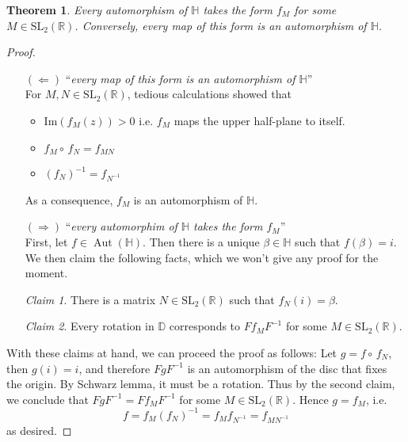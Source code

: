 \documentclass{article}
\theoremstyle{plain}
\newtheorem{theorem}{Theorem}
\theoremstyle{remark}
\newtheorem{claim}{Claim}
\DeclareMathOperator{\Aut}{Aut}
\def\IM{\text{Im}}
\def\inv{^{-1}}
\def\SL{\text{SL}_2(\mathbb R)}
\def\H{\mathbb{H}}
\def\D{\mathbb{D}}
\begin{document}
\noindent\hrulefill
\begin{theorem}
  Every automorphism of $\H$ takes the form $f_M$ for some $M\in\SL$.
  Conversely, every map of this form is an automorphism of $\H$.
\end{theorem}
\noindent\hrulefill
\begin{proof}
  \text{}
  \begin{itemize}
   \item[$(\Leftarrow)$] ``\textit{every map of this form is an automorphism of $\H$}''\\[0.2cm]
     For $M, N\in\SL$,  tedious calculations showed that
     \begin{itemize}[label={$\rhd$}]
     \item $\IM(f_M(z))>0$ i.e. $f_M$ maps the upper half-plane to itself.
     \item $f_M \circ\, f_N = f_{MN}$
     \item $(f_N)\inv = f_{N\inv}$
     \end{itemize}
     As a consequence, $f_M$ is an automorphism of $\H$.
     
   \item[$(\Rightarrow)$] ``\textit{every automorphim of $\H$ takes the form $f_M$}''\\[0.2cm]
     First, let $f\in\Aut(\H)$. Then there is a unique $\beta\in\H$  such that
     $f(\beta)=i$. We then claim the following facts, which we won't give any proof
     for the moment.
     \begin{claim}
       There is a matrix $N\in\SL$ such that $f_N(i)=\beta$.
     \end{claim}
     \begin{claim}
       Every rotation in $\D$ corresponds to $Ff_MF\inv$ for some $M\in\SL$.
     \end{claim}
   \end{itemize}

   With these claims at hand, we can proceed the proof as follows: Let $g=f\circ\,f_N$, then
   $g(i)=i$, and therefore $FgF\inv$ is an automorphism of the disc that fixes the origin.
   By Schwarz lemma, it must be a rotation. Thus by the second claim, we conclude that
   $FgF\inv = Ff_MF\inv$ for some $M\in\SL$. Hence $g=f_M$, i.e.
   \[f = f_M(f_N)\inv = f_Mf_{N\inv}= f_{MN\inv}\]
   as desired.
\end{proof}



	
\end{document}
